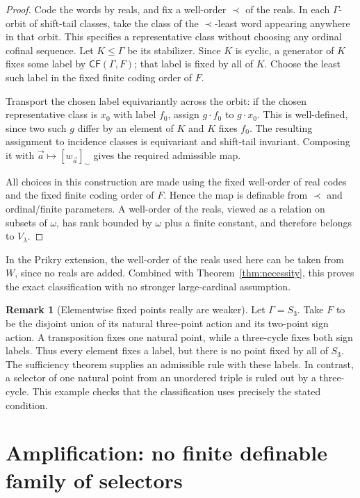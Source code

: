 \documentclass[11pt,letterpaper]{article}
\theoremstyle{definition}
\newtheorem{remark}[definition]{Remark}
\numberwithin{equation}{section}
\newcommand{\CF}{\mathsf{CF}}
\begin{document}
\begin{proof}
Code the words by reals, and fix a well-order $\prec$ of the reals. In each $\Gamma$-orbit of shift-tail classes, take the class of the $\prec$-least word appearing anywhere in that orbit. This specifies a representative class without choosing any ordinal cofinal sequence. Let $K\leq\Gamma$ be its stabilizer. Since $K$ is cyclic, a generator of $K$ fixes some label by $\CF(\Gamma,F)$; that label is fixed by all of $K$. Choose the least such label in the fixed finite coding order of $F$.

Transport the chosen label equivariantly across the orbit: if the chosen representative class is $x_0$ with label $f_0$, assign $g\cdot f_0$ to $g\cdot x_0$. This is well-defined, since two such $g$ differ by an element of $K$ and $K$ fixes $f_0$. The resulting assignment to incidence classes is equivariant and shift-tail invariant. Composing it with $\vec a\mapsto[w_{\vec a}]_\sim$ gives the required admissible map.

All choices in this construction are made using the fixed well-order of real codes and the fixed finite coding order of $F$. Hence the map is definable from $\prec$ and ordinal/finite parameters. A well-order of the reals, viewed as a relation on subsets of $\omega$, has rank bounded by $\omega$ plus a finite constant, and therefore belongs to $V_\lambda$.
\end{proof}

In the Prikry extension, the well-order of the reals used here can be taken from $W$, since no reals are added. Combined with Theorem~\ref{thm:necessity}, this proves the exact classification with no stronger large-cardinal assumption.

\begin{remark}[Elementwise fixed points really are weaker]\label{rem:s3}
Let $\Gamma=S_3$. Take $F$ to be the disjoint union of its natural three-point action and its two-point sign action. A transposition fixes one natural point, while a three-cycle fixes both sign labels. Thus every element fixes a label, but there is no point fixed by all of $S_3$. The sufficiency theorem supplies an admissible rule with these labels. In contrast, a selector of one natural point from an unordered triple is ruled out by a three-cycle. This example checks that the classification uses precisely the stated condition.
\end{remark}

\section{Amplification: no finite definable family of selectors}\label{sec:selectors}
\end{document}
